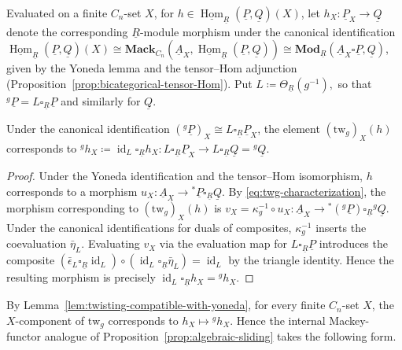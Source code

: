 \documentclass[11pt,oneside]{amsart}
\DeclareMathOperator{\Hom}{Hom}
\DeclareMathOperator{\id}{id}
\numberwithin{equation}{section}
\numberwithin{figure}{section}
\theoremstyle{plain}
\theoremstyle{definition}
\theoremstyle{remark}
\begin{document}
Evaluated on a finite \(C_n\)-set \(X\), for \(h\in \underline{\Hom}_{\underline R}(\underline P,\underline Q)(X)\), let \(h_X\colon \underline P_X\to \underline Q\) denote the corresponding \(\underline R\)-module morphism under the canonical identification \(\underline{\Hom}_{\underline R}(\underline P,\underline Q)(X) \cong \mathbf{Mack}_{C_n}(\underline A_X,\underline{\Hom}_{\underline R}(\underline P,\underline Q)) \cong \mathbf{Mod}_{\underline R}(\underline A_X\square \underline P,\underline Q)\), given by the Yoneda lemma and the tensor--Hom adjunction (Proposition~\ref{prop:bicategorical-tensor-Hom}).
Put
\(
L\coloneqq\Theta_{\underline R}(g^{-1}),
\)
so that
\(
{}^g\underline P=L\square_{\underline R}\underline P
\)
and similarly for \(\underline Q\).

\begin{lemma}\label{lem:twisting-compatible-with-yoneda}
Under the canonical identification \(({}^g\underline P)_X \cong L\square_{\underline R}\underline P_X\), the element \((\mathrm{tw}_g)_X(h)\) corresponds to \({}^g h_X\coloneqq \id_L\square_{\underline R}h_X \colon L\square_{\underline R}\underline P_X \to L\square_{\underline R}\underline Q = {}^g\underline Q\).
\end{lemma}
\begin{proof}
Under the Yoneda identification and the tensor--Hom isomorphism, \(h\) corresponds to a morphism \(u_X\colon \underline A_X \to {}^*\underline P\square_{\underline R}\underline Q\). By \eqref{eq:twg-characterization}, the morphism corresponding to \((\mathrm{tw}_g)_X(h)\) is \(v_X=\kappa_g^{-1}\circ u_X\colon \underline A_X \to {}^*({}^g\underline P) \square_{\underline R}{}^g\underline Q\). Under the canonical identifications for duals of composites, \(\kappa_g^{-1}\) inserts the coevaluation \(\bar\eta_L\). Evaluating \(v_X\) via the evaluation map for \(L\square_{\underline R}\underline P\) introduces the composite \((\bar\epsilon_L\square_{\underline R}\id_L) \circ (\id_L\square_{\underline R}\bar\eta_L) = \id_L\) by the triangle identity. Hence the resulting morphism is precisely \(\id_L\square_{\underline R}h_X = {}^gh_X\).
\end{proof}

By Lemma~\ref{lem:twisting-compatible-with-yoneda}, for every finite
\(C_n\)-set \(X\), the \(X\)-component of \(\mathrm{tw}_g\)
corresponds to \(h_X\mapsto{}^gh_X\). Hence the internal
Mackey-functor analogue of
Proposition~\ref{prop:algebraic-sliding} takes the following form.

 
\end{document}

